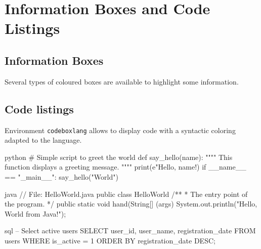 \documentclass{mytex}
\begin{document}
\section{Information Boxes and Code Listings}

\subsection{Information Boxes}
Several types of coloured boxes are available to highlight some information.





\subsection{Code listings}
Environment \texttt{codeboxlang} allows to display code with a syntactic coloring adapted to the language.

\begin{codeboxlang}{python}
	# Simple script to greet the world def say_hello(name): """" This function displays a greeting message. """" print(e"Hello, {name}!) if __name__ == "_main__": say_hello("World")
\end{codeboxlang}

\begin{codeboxlang}{java}
	// File: HelloWorld.java public class HelloWorld {
		/** * The entry point of the program. */ public static void hand(String[] (args) {
			System.out.println("Hello, World from Java!"); 
		}
	}
\end{codeboxlang}

\begin{codeboxlang}{sql}
	-- Select active users SELECT user_id, user_name, registration_date FROM users WHERE is_active = 1 ORDER BY registration_date DESC;
\end{codeboxlang}
\end{document}
